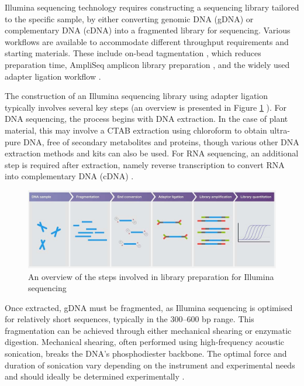 Illumina sequencing technology requires constructing a sequencing library tailored to the specific sample, by either converting genomic DNA (gDNA) or complementary DNA (cDNA) into a fragmented library for sequencing. Various workflows are available to accommodate different throughput requirements and starting materials. These include on-bead tagmentation \cite{RN314}, which reduces preparation time, AmpliSeq amplicon library preparation \cite{RN315}, and the widely used adapter ligation workflow \cite{RN316}.

The construction of an Illumina sequencing library using adapter ligation typically involves several key steps (an overview is presented in Figure \ref{fig:illumina_library_prep} \cite{RN312}). For DNA sequencing, the process begins with DNA extraction. In the case of plant material, this may involve a CTAB extraction \cite{RN321} using chloroform to obtain ultra-pure DNA, free of secondary metabolites and proteins, though various other DNA extraction methods and kits can also be used. For RNA sequencing, an additional step is required after extraction, namely reverse transcription to convert RNA into complementary DNA (cDNA) \cite{RN312,RN317}.

\begin{figure}[htbp!] 
\centering    
    \includegraphics[width=1\textwidth]{Chapter1/Figs/illumina_library_prep.jpg}
\caption{An overview of the steps involved in library preparation for Illumina sequencing \cite{RN312}}
\label{fig:illumina_library_prep}
\captionsetup{font=small}
\end{figure}

Once extracted, gDNA must be fragmented, as Illumina sequencing is optimised for relatively short sequences, typically in the 300–600 bp range. This fragmentation can be achieved through either mechanical shearing or enzymatic digestion. Mechanical shearing, often performed using high-frequency acoustic sonication, breaks the DNA’s phosphodiester backbone. The optimal force and duration of sonication vary depending on the instrument and experimental needs and should ideally be determined experimentally \cite{RN312}.


